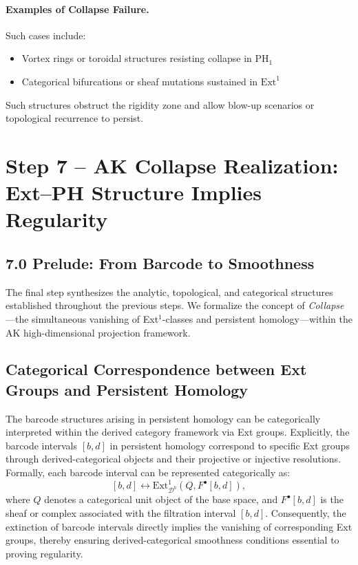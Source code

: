 \documentclass[11pt]{article}
\theoremstyle{definition}
\begin{document}
\paragraph{Examples of Collapse Failure.}
Such cases include:
\begin{itemize}
    \item Vortex rings or toroidal structures resisting collapse in $\mathrm{PH}_1$
    \item Categorical bifurcations or sheaf mutations sustained in $\mathrm{Ext}^1$
\end{itemize}

Such structures obstruct the rigidity zone and allow blow-up scenarios or topological recurrence to persist.


\section{Step 7 – AK Collapse Realization: Ext–PH Structure Implies Regularity}

\subsection*{7.0 Prelude: From Barcode to Smoothness}

The final step synthesizes the analytic, topological, and categorical structures established throughout the previous steps.  
We formalize the concept of \emph{Collapse}—the simultaneous vanishing of Ext$^1$-classes and persistent homology—within the AK high-dimensional projection framework.

\subsection{Categorical Correspondence between Ext Groups and Persistent Homology}

The barcode structures arising in persistent homology can be categorically interpreted within the derived category framework via Ext groups. Explicitly, the barcode intervals $[b,d]$ in persistent homology correspond to specific Ext groups through derived-categorical objects and their projective or injective resolutions. Formally, each barcode interval can be represented categorically as:
\[
[b,d] \longleftrightarrow \mathrm{Ext}^1_{\mathcal{D}^b}(Q,F^\bullet[b,d]),
\]
where $Q$ denotes a categorical unit object of the base space, and $F^\bullet[b,d]$ is the sheaf or complex associated with the filtration interval $[b,d]$. Consequently, the extinction of barcode intervals directly implies the vanishing of corresponding Ext groups, thereby ensuring derived-categorical smoothness conditions essential to proving regularity.
\end{document}
